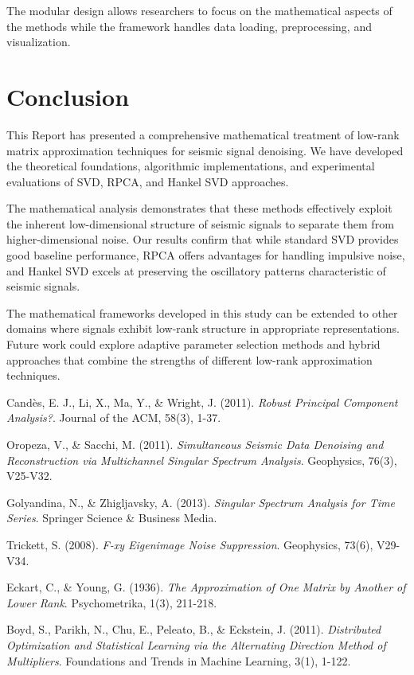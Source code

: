 \documentclass[11pt]{article}
\begin{document}
The modular design allows researchers to focus on the mathematical aspects of the methods while the framework handles data loading, preprocessing, and visualization.

\section{Conclusion}
This Report has presented a comprehensive mathematical treatment of low-rank matrix approximation techniques for seismic signal denoising. We have developed the theoretical foundations, algorithmic implementations, and experimental evaluations of SVD, RPCA, and Hankel SVD approaches.

The mathematical analysis demonstrates that these methods effectively exploit the inherent low-dimensional structure of seismic signals to separate them from higher-dimensional noise. Our results confirm that while standard SVD provides good baseline performance, RPCA offers advantages for handling impulsive noise, and Hankel SVD excels at preserving the oscillatory patterns characteristic of seismic signals.

The mathematical frameworks developed in this study can be extended to other domains where signals exhibit low-rank structure in appropriate representations. Future work could explore adaptive parameter selection methods and hybrid approaches that combine the strengths of different low-rank approximation techniques.

\begin{thebibliography}{9}

Candès, E. J., Li, X., Ma, Y., \& Wright, J. (2011).
\textit{Robust Principal Component Analysis?}.
Journal of the ACM, 58(3), 1-37.

Oropeza, V., \& Sacchi, M. (2011).
\textit{Simultaneous Seismic Data Denoising and Reconstruction via Multichannel Singular Spectrum Analysis}.
Geophysics, 76(3), V25-V32.

Golyandina, N., \& Zhigljavsky, A. (2013).
\textit{Singular Spectrum Analysis for Time Series}.
Springer Science \& Business Media.

Trickett, S. (2008).
\textit{F-xy Eigenimage Noise Suppression}.
Geophysics, 73(6), V29-V34.

Eckart, C., \& Young, G. (1936).
\textit{The Approximation of One Matrix by Another of Lower Rank}.
Psychometrika, 1(3), 211-218.

Boyd, S., Parikh, N., Chu, E., Peleato, B., \& Eckstein, J. (2011).
\textit{Distributed Optimization and Statistical Learning via the Alternating Direction Method of Multipliers}.
Foundations and Trends in Machine Learning, 3(1), 1-122.

\end{thebibliography}
\end{document}
